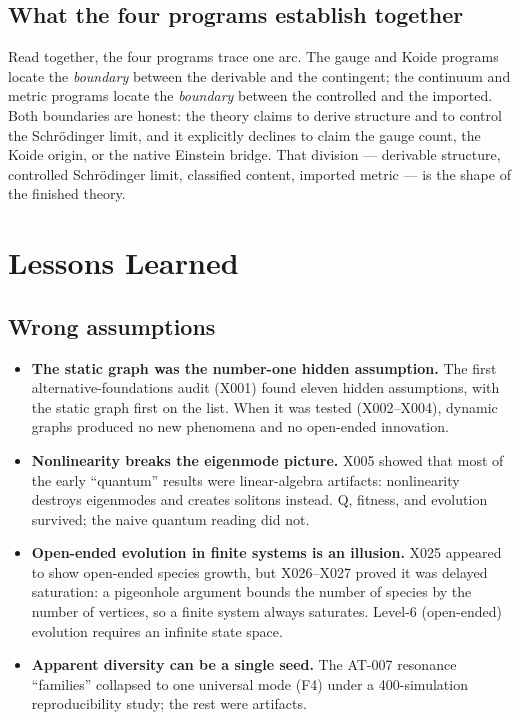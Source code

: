 \documentclass[10pt,twoside,openany]{book}
\begin{document}
\section{What the four programs establish together}

Read together, the four programs trace one arc. The gauge and Koide programs locate the
\emph{boundary} between the derivable and the contingent; the continuum and metric
programs locate the \emph{boundary} between the controlled and the imported. Both
boundaries are honest: the theory claims to derive structure and to control the
Schr\"odinger limit, and it explicitly declines to claim the gauge count, the Koide
origin, or the native Einstein bridge. That division --- derivable structure, controlled
Schr\"odinger limit, classified content, imported metric --- is the shape of the finished
theory.

\chapter{Lessons Learned}
\label{ch:lessons}

\section{Wrong assumptions}

\begin{itemize}
\item \textbf{The static graph was the number-one hidden assumption.} The first
alternative-foundations audit (X001) found eleven hidden assumptions, with the static
graph first on the list. When it was tested (X002--X004), dynamic graphs produced no new
phenomena and no open-ended innovation.
\item \textbf{Nonlinearity breaks the eigenmode picture.} X005 showed that most of the
early ``quantum'' results were linear-algebra artifacts: nonlinearity destroys eigenmodes
and creates solitons instead. Q, fitness, and evolution survived; the naive quantum
reading did not.
\item \textbf{Open-ended evolution in finite systems is an illusion.} X025 appeared to
show open-ended species growth, but X026--X027 proved it was delayed saturation: a
pigeonhole argument bounds the number of species by the number of vertices, so a finite
system always saturates. Level-6 (open-ended) evolution requires an infinite state space.
\item \textbf{Apparent diversity can be a single seed.} The AT-007 resonance ``families''
collapsed to one universal mode (F4) under a 400-simulation reproducibility study; the
rest were artifacts.
\end{itemize}
\end{document}
